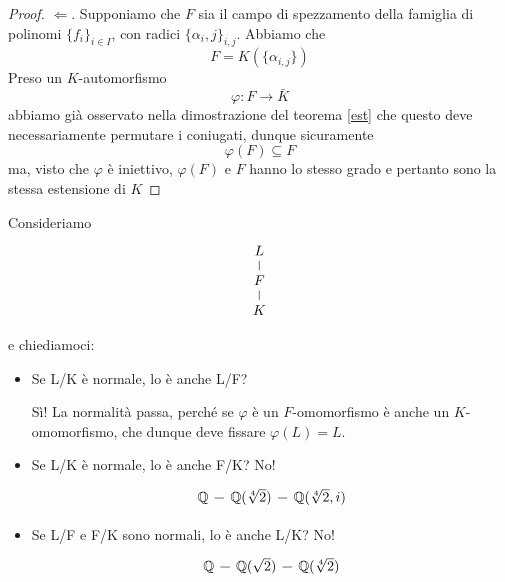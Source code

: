 \begin{multicols}{2}
\begin{proof}
	$ \Leftarrow $. Supponiamo che $ F $ sia il campo di spezzamento della famiglia di polinomi $ \{f_i\}_{i \in I} $, con radici $ \{\alpha_i,j\}_{i,j} $. Abbiamo che 
	\[F = K(\{\alpha_{i, j}\})\]
	 Preso un $ K $-automorfismo
	 \[ \varphi \colon F \to \bar{K} \]
	 abbiamo già osservato nella dimostrazione del teorema \ref{est} che questo deve necessariamente permutare i coniugati, dunque sicuramente
	 \[ \varphi(F) \subseteq F \]
	 ma, visto che $ \varphi $ è iniettivo, $ \varphi(F) $ e $ F $ hanno lo stesso grado e pertanto sono la stessa estensione di $ K $
\end{proof}

 Consideriamo
\[\begin{tikzcd}[row sep=0.25cm]
L \arrow [d,-] \\
F \arrow [d,-] \\
K
\end{tikzcd} \]

e chiediamoci:
\begin{itemize}
	\item Se L/K è normale, lo è anche L/F?
	
	Sì! La normalità passa, perché se $ \varphi $ è un $ F $-omomorfismo è anche un $ K $-omomorfismo, che dunque deve fissare $ \varphi(L)=L $.
	
	\item Se L/K è normale, lo è anche F/K? No!
	\[\begin{tikzcd}[column sep=0.25cm]
	\Q \arrow [r,-] &
	\Q(\sqrt[4]{2}) \arrow [r,-] &
	\Q(\sqrt[4]{2}, i)
	\end{tikzcd} \]
	
	\item Se L/F e F/K sono normali, lo è anche L/K? No!
	\[\begin{tikzcd}[column sep=0.25cm]
	\Q \arrow [r,-] &
	\Q(\sqrt{2}) \arrow [r,-] &
	\Q(\sqrt[4]{2})
	\end{tikzcd} \]
\end{itemize}

\end{multicols}


